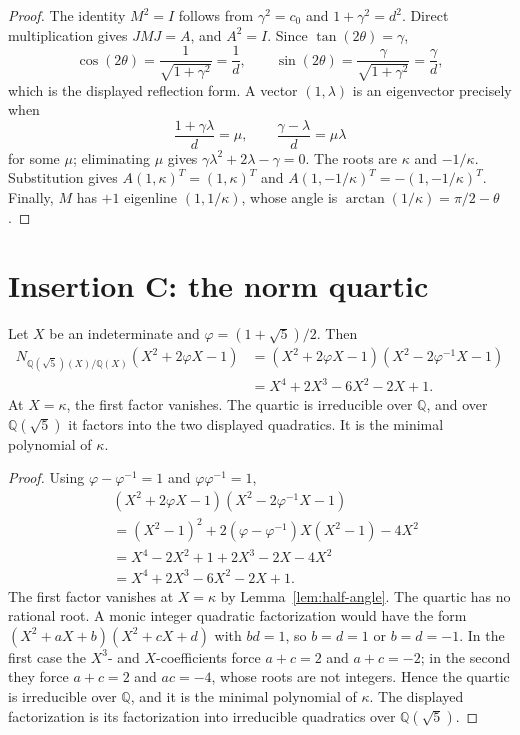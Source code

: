 \begin{proof}
The identity \(M^2=I\) follows from \(\gamma^2=c_0\) and \(1+\gamma^2=d^2\). Direct multiplication gives \(JMJ=A\), and \(A^2=I\). Since \(\tan(2\theta)=\gamma\),
\[
\cos(2\theta)=\frac1{\sqrt{1+\gamma^2}}=\frac1d,
\qquad
\sin(2\theta)=\frac{\gamma}{\sqrt{1+\gamma^2}}=\frac{\gamma}{d},
\]
which is the displayed reflection form. A vector \((1,\lambda)\) is an eigenvector precisely when
\[
\frac{1+\gamma\lambda}{d}=\mu,
\qquad
\frac{\gamma-\lambda}{d}=\mu\lambda
\]
for some \(\mu\); eliminating \(\mu\) gives \(\gamma\lambda^2+2\lambda-\gamma=0\). The roots are \(\kappa\) and \(-1/\kappa\). Substitution gives \(A(1,\kappa)^T=(1,\kappa)^T\) and \(A(1,-1/\kappa)^T=-(1,-1/\kappa)^T\). Finally, \(M\) has \(+1\) eigenline \((1,1/\kappa)\), whose angle is \(\arctan(1/\kappa)=\pi/2-\theta\).
\end{proof}

\section*{Insertion C: the norm quartic}

\begin{lemma}\label{lem:norm-quartic}
Let \(X\) be an indeterminate and \(\varphi=(1+\sqrt5)/2\). Then
\begin{align*}
N_{\mathbb Q(\sqrt5)(X)/\mathbb Q(X)}(X^2+2\varphi X-1)
&=(X^2+2\varphi X-1)(X^2-2\varphi^{-1}X-1)\\
&=X^4+2X^3-6X^2-2X+1.
\end{align*}
At \(X=\kappa\), the first factor vanishes. The quartic is irreducible over \(\mathbb Q\), and over \(\mathbb Q(\sqrt5)\) it factors into the two displayed quadratics. It is the minimal polynomial of \(\kappa\).
\end{lemma}

\begin{proof}
Using \(\varphi-\varphi^{-1}=1\) and \(\varphi\varphi^{-1}=1\),
\[
\begin{aligned}
&(X^2+2\varphi X-1)(X^2-2\varphi^{-1}X-1)\\
&=(X^2-1)^2+2(\varphi-\varphi^{-1})X(X^2-1)-4X^2\\
&=X^4-2X^2+1+2X^3-2X-4X^2\\
&=X^4+2X^3-6X^2-2X+1.
\end{aligned}
\]
The first factor vanishes at \(X=\kappa\) by Lemma~\ref{lem:half-angle}. The quartic has no rational root. A monic integer quadratic factorization would have the form \((X^2+aX+b)(X^2+cX+d)\) with \(bd=1\), so \(b=d=1\) or \(b=d=-1\). In the first case the \(X^3\)- and \(X\)-coefficients force \(a+c=2\) and \(a+c=-2\); in the second they force \(a+c=2\) and \(ac=-4\), whose roots are not integers. Hence the quartic is irreducible over \(\mathbb Q\), and it is the minimal polynomial of \(\kappa\). The displayed factorization is its factorization into irreducible quadratics over \(\mathbb Q(\sqrt5)\).
\end{proof}

